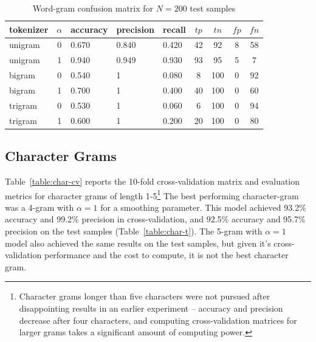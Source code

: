 \documentclass[10pt]{article}
\def \testSize {200}
\begin{document}
\begin{table}[b]
  \centering
  \caption{Word-gram confusion matrix for $N=\testSize$ test samples}
  \label{table:word-t}
  \begin{tabular}{lclllcccc}
    \toprule
    tokenizer & $\alpha$ & accuracy & precision & recall & $tp$ & $tn$ & $fp$ & $fn$ \\ \midrule
    unigram & 0 & 0.670 & 0.840 & 0.420 & 42 & 92 & 8 & 58 \\
    unigram & 1 & 0.940 & 0.949 & 0.930 & 93 & 95 & 5 & 7 \\
    bigram & 0 & 0.540 & 1 & 0.080 & 8 & 100 & 0 & 92 \\
    bigram & 1 & 0.700 & 1 & 0.400 & 40 & 100 & 0 & 60 \\
    trigram & 0 & 0.530 & 1 & 0.060 & 6 & 100 & 0 & 94 \\
    trigram & 1 & 0.600 & 1 & 0.200 & 20 & 100 & 0 & 80\\
    \bottomrule
  \end{tabular}
\end{table}

\subsection{Character Grams}

Table~\ref{table:char-cv} reports the 10-fold cross-validation matrix and
evaluation metrics for character grams of length 1-5\footnote{%
  Character grams longer than five characters were not pursued after
  disappointing results in an earlier experiment -- accuracy and precision
  decrease after four characters, and computing cross-validation matrices for
  larger grams takes a significant amount of computing power.}
  The best performing character-gram was a 4-gram with $\alpha = 1$
for a smoothing parameter. This model achieved 93.2\% accuracy and 99.2\%
precision in cross-validation, and 92.5\% accuracy and 95.7\% precision on the
test samples (Table~\ref{table:char-t}). The 5-gram with $\alpha=1$ model also
achieved the same results on the test samples, but given it's cross-validation
performance and the cost to compute, it is not the best character gram.
\end{document}
